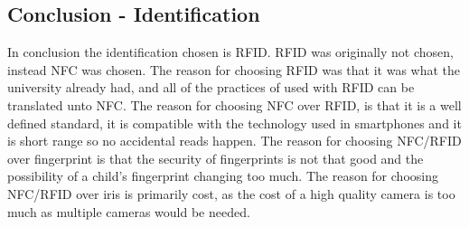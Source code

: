 \subsection{Conclusion - Identification}
In conclusion the identification chosen is RFID. RFID was originally not chosen, instead NFC was chosen. The reason for choosing RFID was that it was what the university already had, and all of the practices of used with RFID can be translated unto NFC. The reason for choosing NFC over RFID, is that it is a well defined standard, it is compatible with the technology used in smartphones and it is short range so no accidental reads happen. The reason for choosing NFC/RFID over fingerprint is that the security of fingerprints is not that good and the possibility of a child's fingerprint changing too much. The reason for choosing NFC/RFID over iris is primarily cost, as the cost of a high quality camera is too much as multiple cameras would be needed.
